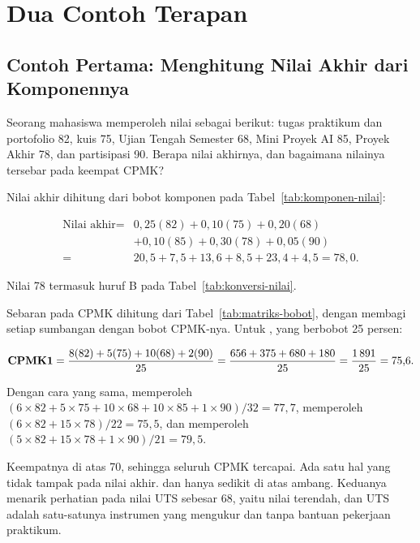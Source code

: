 \section{Dua Contoh Terapan}
\label{sec:contoh-bab-17}

\subsection{Contoh Pertama: Menghitung Nilai Akhir dari Komponennya}

\begin{contohbox}
Seorang mahasiswa memperoleh nilai sebagai berikut: tugas praktikum dan
portofolio 82, kuis 75, Ujian Tengah Semester 68, Mini Proyek AI 85, Proyek
Akhir 78, dan partisipasi 90. Berapa nilai akhirnya, dan bagaimana nilainya
tersebar pada keempat CPMK?
\end{contohbox}

Nilai akhir dihitung dari bobot komponen pada
Tabel~\ref{tab:komponen-nilai}:

\[
\begin{aligned}
\text{Nilai akhir} ={}& 0{,}25(82) + 0{,}10(75) + 0{,}20(68) \\
&+ 0{,}10(85) + 0{,}30(78) + 0{,}05(90) \\
={}& 20{,}5 + 7{,}5 + 13{,}6 + 8{,}5 + 23{,}4 + 4{,}5
= 78{,}0 .
\end{aligned}
\]

Nilai 78 termasuk huruf B pada Tabel~\ref{tab:konversi-nilai}.

Sebaran pada CPMK dihitung dari Tabel~\ref{tab:matriks-bobot}, dengan
membagi setiap sumbangan dengan bobot CPMK-nya. Untuk , yang berbobot
25 persen:

\[
\text{\textbf{CPMK1}} = \frac{8(82) + 5(75) + 10(68) + 2(90)}{25}
= \frac{656 + 375 + 680 + 180}{25} = \frac{1\,891}{25} = 75{,}6 .
\]

Dengan cara yang sama,  memperoleh
$(6 \times 82 + 5 \times 75 + 10 \times 68 + 10 \times 85 + 1 \times 90)/32
= 77{,}7$,  memperoleh
$(6 \times 82 + 15 \times 78)/22 = 75{,}5$, dan  memperoleh
$(5 \times 82 + 15 \times 78 + 1 \times 90)/21 = 79{,}5$.

Keempatnya di atas 70, sehingga seluruh CPMK tercapai. Ada satu hal yang tidak
tampak pada nilai akhir.  dan  hanya sedikit di atas ambang.
Keduanya menarik perhatian pada nilai UTS sebesar 68, yaitu nilai terendah, dan
UTS adalah satu-satunya instrumen yang mengukur  dan  tanpa
bantuan pekerjaan praktikum.

